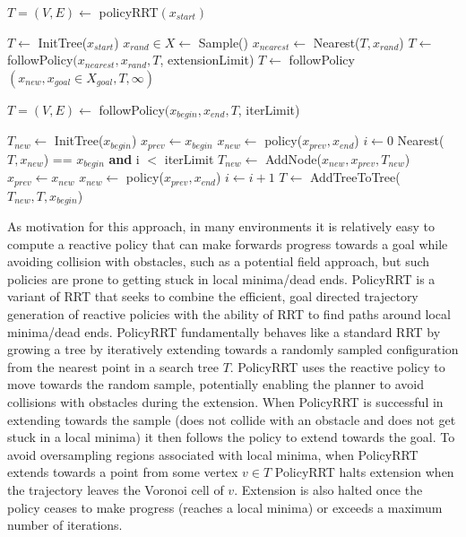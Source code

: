 \documentclass[../thesis.tex]{subfiles}
\begin{document}
\begin{algorithm}
\caption{$T=(V,E) \leftarrow$ policyRRT$(x_{start})$}\label{euclid}
\begin{algorithmic}[1]
\State $T \leftarrow$ InitTree($x_{start}$)
\State $x_{rand} \in X \leftarrow$ Sample()
\State $x_{nearest} \leftarrow $ Nearest($T, x_{rand}$)
\State $T \leftarrow $ followPolicy$(x_{nearest}, x_{rand}, T$, extensionLimit)
\State $T \leftarrow $ followPolicy$(x_{new}, x_{goal} \in X_{goal}, T, \infty)$
\EndIf
\EndWhile
\end{algorithmic}
\end{algorithm}

\begin{algorithm}
\caption{$T=(V,E) \leftarrow$ followPolicy$(x_{begin}, x_{end}, T$, iterLimit)}\label{euclid}
\begin{algorithmic}[1]
\State $T_{new} \leftarrow $ InitTree($x_{begin}$)
\State $x_{prev} \leftarrow x_{begin}$
\State $x_{new} \leftarrow $ policy($x_{prev}, x_{end}$)
\State $i \leftarrow 0$
\StatexIndent[2] Nearest($T, x_{new}$) == $x_{begin}$ \textbf{and}
\StatexIndent[2] i $<$ iterLimit
\algorithmicdo
\State $T_{new} \leftarrow $ AddNode($x_{new}, x_{prev}, T_{new}$)
\State $x_{prev} \leftarrow x_{new}$ 
\State $x_{new} \leftarrow $ policy($x_{prev}, x_{end}$)
\State $i \leftarrow i+1$
\EndWhile
\State $T \leftarrow $ AddTreeToTree($T_{new}, T, x_{begin}$)
\end{algorithmic}
\end{algorithm}

As motivation for this approach, in many environments it is relatively easy to compute a reactive policy that can make forwards progress towards a goal while avoiding collision with obstacles, such as a potential field approach, but such policies are prone to getting stuck in local minima/dead ends.
PolicyRRT is a variant of RRT that seeks to combine the efficient, goal directed trajectory generation of reactive policies with the ability of RRT to find paths around local minima/dead ends.
PolicyRRT fundamentally behaves like a standard RRT by growing a tree by iteratively extending towards a randomly sampled configuration from the nearest point in a search tree $T$.
PolicyRRT uses the reactive policy to move towards the random sample, potentially enabling the planner to avoid collisions with obstacles during the extension.
When PolicyRRT is successful in extending towards the sample (does not collide with an obstacle and does not get stuck in a local minima) it then follows the policy to extend towards the goal.
To avoid oversampling regions associated with local minima, when PolicyRRT extends towards a point from some vertex $v \in T$ PolicyRRT halts extension when the trajectory leaves the Voronoi cell of $v$.
Extension is also halted once the policy ceases to make progress (reaches a local minima) or exceeds a maximum number of iterations.
\end{document}
